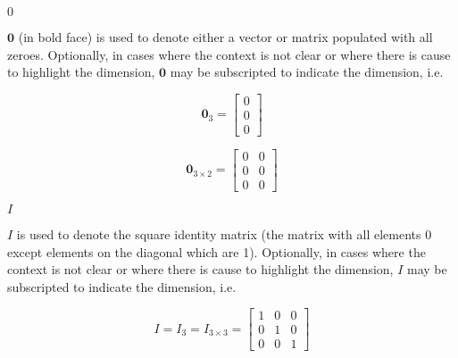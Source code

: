 \begin{vworkmathtermglossaryenum}

\item \mbox{\boldmath $0$}

      $\mathbf{0}$ (in bold face) is used to denote either a vector or matrix
      populated with all zeroes.  Optionally, in cases where the context is not clear
      or where there is cause to highlight the dimension, $\mathbf{0}$ may be subscripted
      to indicate the dimension, i.e. 
      
      \begin{equation}
      \nonumber
      \mathbf{0}_3 = \left[\begin{array}{c} 0 \\ 0 \\ 0 \end{array}\right]
      \end{equation}

      \begin{equation}
      \nonumber
      \mathbf{0}_{3 \times 2} = \left[\begin{array}{cc} 0&0 \\ 0&0 \\ 0&0 \end{array}\right]
      \end{equation}

\item \mbox{\boldmath $I$}

      $I$ is used to denote the square identity matrix (the matrix with all
      elements 0 except elements on the diagonal which are 1).
      Optionally, in cases where the context is not clear
      or where there is cause to highlight the dimension, $I$ may be subscripted
      to indicate the dimension, i.e. 
      
      \begin{equation}
      \nonumber
      I = I_3 = I_{3 \times 3} = \left[\begin{array}{ccc} 1&0&0 \\ 0&1&0 \\ 0&0&1 \end{array}\right]
      \end{equation}

\end{vworkmathtermglossaryenum}



